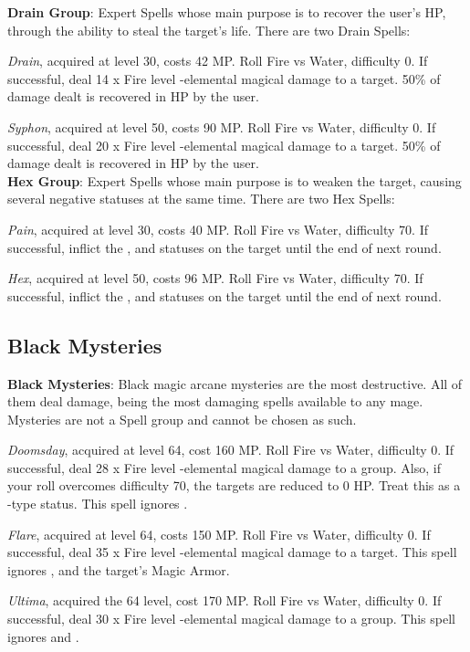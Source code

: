 \begin{multicols}{2}
    \textbf{Drain Group}: Expert Spells whose main purpose is to recover the user's HP, through the ability to steal the target’s life. There are two Drain Spells:
    
    \textit{Drain}, acquired at level 30, costs 42 MP\@. Roll Fire vs Water, difficulty 0. If successful, deal 14 x Fire level -elemental magical damage to a target. 50\% of damage dealt is recovered in HP by the user.
    
    \textit{Syphon}, acquired at level 50, costs 90 MP\@. Roll Fire vs Water, difficulty 0. If successful, deal 20 x Fire level -elemental magical damage to a target. 50\% of damage dealt is recovered in HP by the user.\\%
    
    \textbf{Hex Group}: Expert Spells whose main purpose is to weaken the target, causing several negative statuses at the same time. There are two Hex Spells:
    
    \textit{Pain}, acquired at level 30, costs 40 MP\@. Roll Fire vs Water, difficulty 70. If successful, inflict the ,  and  statuses on the target until the end of next round.
    
    \textit{Hex}, acquired at level 50, costs 96 MP\@. Roll Fire vs Water, difficulty 70. If successful, inflict the ,  and  statuses on the target until the end of next round.
    
    \subsection{Black Mysteries}\label{subsec:black-mysteries}

    \textbf{Black Mysteries}: Black magic arcane mysteries are the most destructive. All of them deal damage, being the most damaging spells available to any mage. Mysteries are not a Spell group and cannot be chosen as such.
    
    \textit{Doomsday}, acquired at level 64, cost 160 MP\@. Roll Fire vs Water, difficulty 0. If successful, deal 28 x Fire level -elemental magical damage to a group. Also, if your roll overcomes difficulty 70, the targets are reduced to 0 HP\@. Treat this as a -type status.  This spell ignores .
    
    \textit{Flare}, acquired at level 64, costs 150 MP\@. Roll Fire vs Water, difficulty 0. If successful, deal 35 x Fire level -elemental magical damage to a target. This spell ignores ,  and the target’s Magic Armor.  
    
    \textit{Ultima}, acquired the 64 level, cost 170 MP\@. Roll Fire vs Water, difficulty 0. If successful, deal 30 x Fire level -elemental magical damage to a group. This spell ignores  and . 

\end{multicols}

